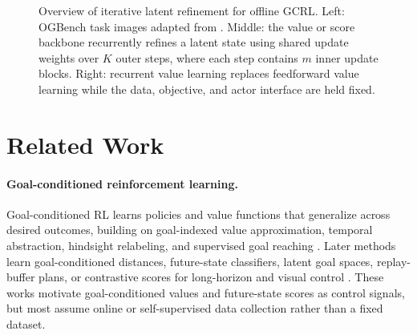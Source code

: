 \documentclass{article}
\begin{document}
\begin{figure}[t]
{
}
\caption{
Overview of iterative latent refinement for offline GCRL.
Left: OGBench task images adapted from \citet{ogbench}.
Middle: the value or score backbone recurrently refines a latent state using shared update weights over $K$ outer steps, where each step contains $m$ inner update blocks.
Right: recurrent value learning replaces feedforward value learning while the data, objective, and actor interface are held fixed.
}
\label{fig:refinement-simple}
\end{figure}


\section{Related Work}
\paragraph{Goal-conditioned reinforcement learning.}
Goal-conditioned RL learns policies and value functions that generalize across desired outcomes, building on goal-indexed value approximation, temporal abstraction, hindsight relabeling, and supervised goal reaching \citep{uvfa, options, feudal_rl, her, gcsl}. Later methods learn goal-conditioned distances, future-state classifiers, latent goal spaces, replay-buffer plans, or contrastive scores for long-horizon and visual control \citep{tdm, rig, sorb, skewfit, c_learning, crl}. These works motivate goal-conditioned values and future-state scores as control signals, but most assume online or self-supervised data collection rather than a fixed dataset.
\end{document}
